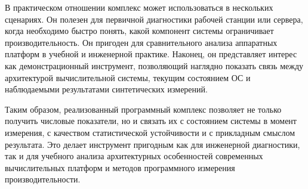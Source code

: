 В практическом отношении комплекс может использоваться в нескольких сценариях. Он полезен для первичной диагностики рабочей станции или сервера, когда необходимо быстро понять, какой компонент системы ограничивает производительность. Он пригоден для сравнительного анализа аппаратных платформ в учебной и инженерной практике. Наконец, он представляет интерес как демонстрационный инструмент, позволяющий наглядно показать связь между архитектурой вычислительной системы, текущим состоянием ОС и наблюдаемыми результатами синтетических измерений.

Таким образом, реализованный программный комплекс позволяет не только получить числовые показатели, но и связать их с состоянием системы в момент измерения, с качеством статистической устойчивости и с прикладным смыслом результата. Это делает инструмент пригодным как для инженерной диагностики, так и для учебного анализа архитектурных особенностей современных вычислительных платформ и методов программного измерения производительности.

